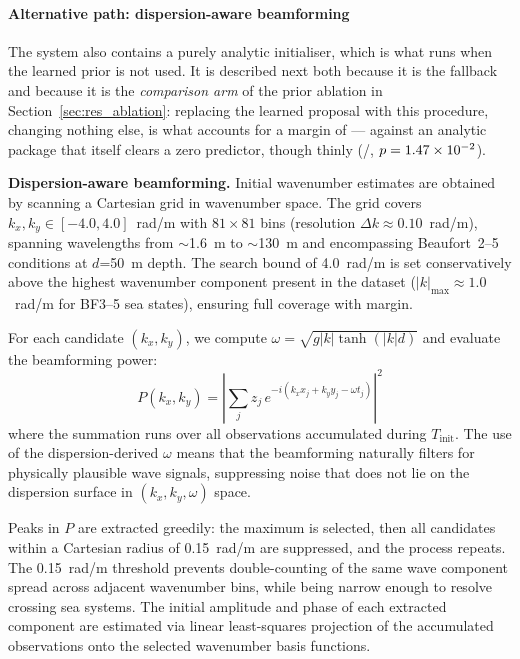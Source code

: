 \documentclass[review]{elsarticle}
\begin{document}
\paragraph{Alternative path: dispersion-aware beamforming}
The system also contains a purely analytic initialiser, which is what runs when the
learned prior is not used. It is described next both because it is the fallback and
because it is the \emph{comparison arm} of the prior ablation in
Section~\ref{sec:res_ablation}: replacing the learned proposal with this procedure,
changing nothing else, is what accounts for a margin of \BTwentyTwoRel{} --- against an analytic package that itself
clears a zero predictor, though thinly (\BTwentyTwoAnaShipZero{}/\BTwentyTwoN{}, $p = 1.47\times 10^{-2}{}$).

\textbf{Dispersion-aware beamforming.}
Initial wavenumber estimates are obtained by scanning a Cartesian
grid in wavenumber space.  The grid covers
$k_x, k_y \in [-4.0, 4.0]$~rad/m with $81 \times 81$ bins
(resolution $\Delta k \approx 0.10$~rad/m), spanning wavelengths
from $\sim$1.6~m to $\sim$130~m and encompassing Beaufort~2--5
conditions at $d$=50~m depth.  The search bound of 4.0~rad/m
is set conservatively above the highest wavenumber component
present in the dataset ($|k|_\text{max} \approx 1.0$~rad/m for
BF3--5 sea states), ensuring full coverage with margin.

For each candidate $(k_x, k_y)$, we compute
$\omega = \sqrt{g|k|\tanh(|k|d)}$ and evaluate the beamforming power:
\begin{equation}
  P(k_x, k_y) = \left| \sum_{j} z_j \, e^{-i(k_x x_j + k_y y_j - \omega t_j)} \right|^2
\end{equation}
where the summation runs over all observations accumulated during
$T_\text{init}$.  The use of the dispersion-derived $\omega$ means
that the beamforming naturally filters for physically plausible
wave signals, suppressing noise that does not lie on the
dispersion surface in $(k_x, k_y, \omega)$ space.

Peaks in $P$ are extracted greedily: the maximum is selected, then
all candidates within a Cartesian radius of 0.15~rad/m are
suppressed, and the process repeats.  The 0.15~rad/m threshold
prevents double-counting of the same wave component spread across
adjacent wavenumber bins, while being narrow enough to resolve
crossing sea systems.  The initial amplitude and phase of each extracted component
are estimated via linear least-squares projection of the accumulated
observations onto the selected wavenumber basis functions.
\end{document}
